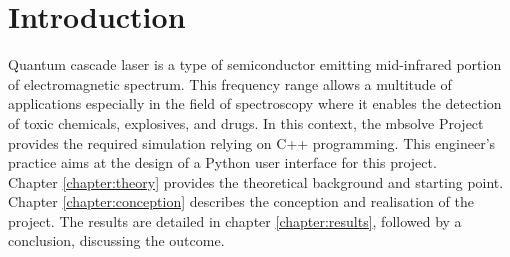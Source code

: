 \chapter{Introduction}
\label{chapter:introduction}

Quantum cascade laser is a type of semiconductor emitting mid-infrared portion of electromagnetic spectrum. This frequency range allows a multitude of applications especially in the field of spectroscopy where it enables the detection of toxic chemicals, explosives, and drugs. In this context, the mbsolve Project provides the required simulation relying on C++ programming. This engineer's practice aims at the design of a Python user interface for this project.\\
Chapter \ref{chapter:theory} provides the theoretical background and starting point. Chapter \ref{chapter:conception} describes the conception and realisation of the project. The results are detailed in chapter \ref{chapter:results}, followed by a conclusion, discussing the outcome.




